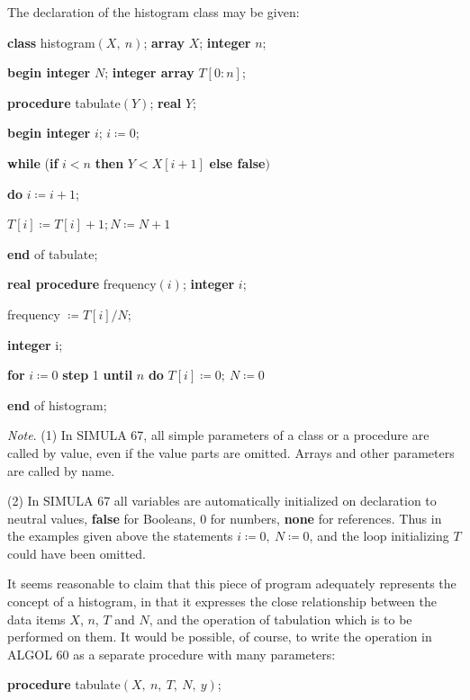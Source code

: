 \documentclass[twoside,11pt]{book}
\begin{document}
The declaration of the histogram class may be given:

\quad \textbf{class} histogram$(X,\ n)$; \textbf{array} $X$; \textbf{integer} $n$;

\quad \quad \textbf{begin integer} $N$; \textbf{integer array} $T[0:n]$;

\quad \quad \quad \textbf{procedure} tabulate$(Y)$; \textbf{real} $Y$;

\quad \quad \quad \quad \textbf{begin integer} $i$; $i\coloneq 0$;

\quad \quad \quad \quad \quad \textbf{while} (\textbf{if} $i < n$ \textbf{then} $Y < X[i + 1]$ \textbf{else false}$)$

\quad \quad \quad \quad \quad \quad \textbf{do} $i\coloneq i + 1$;

\quad \quad \quad \quad \quad $T[i] \coloneq T[i] + 1; N\coloneq N + 1$

\quad \quad \quad \quad \textbf{end} of tabulate;

\quad \quad \quad \textbf{real procedure} frequency$(i)$; \textbf{integer} $i$;

\quad \quad \quad \quad frequency $\coloneq T[i]/N$;

\quad \quad \quad \textbf{integer} i;

\quad \quad \quad \textbf{for} $i\coloneq 0$ \textbf{step} 1 \textbf{until} $n$ \textbf{do} $T[i]\coloneq 0;\ N\coloneq 0$

\quad \textbf{end} of histogram;

\textit{Note}. (1) In SIMULA 67, all simple parameters of a class or a procedure are called by value, even if the value parts are omitted. Arrays and other parameters are called by name.

(2) In SIMULA 67 all variables are automatically initialized on declaration to neutral values, \textbf{false} for Booleans, 0 for numbers, \textbf{none} for references. Thus in the examples given above the statements $i\coloneq 0,\ N\coloneq 0$, and the loop initializing $T$ could have been omitted.

It seems reasonable to claim that this piece of program adequately represents the concept of a histogram, in that it expresses the close relationship between the data items $X$, $n$, $T$ and $N$, and the operation of tabulation which
is to be performed on them. It would be possible, of course, to write the
operation in ALGOL 60 as a separate procedure with many parameters:

\quad \textbf{procedure} tabulate$(X,\ n,\ T,\ N,\ y)$;
\end{document}
